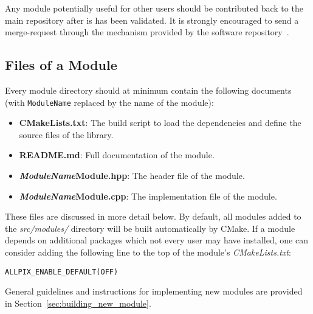 Any module potentially useful for other users should be contributed back to the main repository after is has been validated.
It is strongly encouraged to send a merge-request through the mechanism provided by the software repository~\cite{ap2-repo}.

\subsection{Files of a Module}
\label{sec:module_files}
Every module directory should at minimum contain the following documents (with \texttt{ModuleName} replaced by the name of the module):
\begin{itemize}
\item \textbf{CMakeLists.txt}: The build script to load the dependencies and define the source files of the library.
\item \textbf{README.md}: Full documentation of the module.
\item \textbf{\textit{ModuleName}Module.hpp}: The header file of the module.
\item \textbf{\textit{ModuleName}Module.cpp}: The implementation file of the module.
\end{itemize}
These files are discussed in more detail below.
By default, all modules added to the \textit{src/modules/} directory will be built automatically by CMake.
If a module depends on additional packages which not every user may have installed, one can consider adding the following line to the top of the module's \textit{CMakeLists.txt}:
\begin{verbatim}
ALLPIX_ENABLE_DEFAULT(OFF)
\end{verbatim}

General guidelines and instructions for implementing new modules are provided in Section~\ref{sec:building_new_module}.

